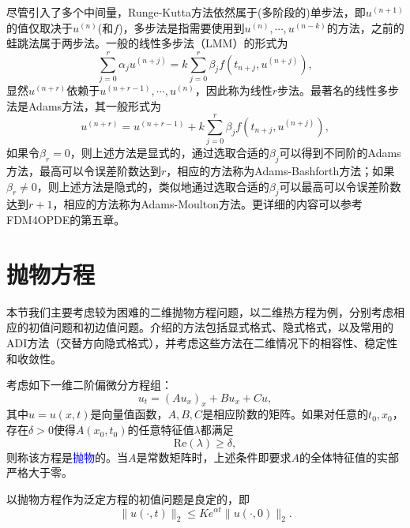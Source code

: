 \documentclass[a4paper,10pt]{ctexart}
\begin{document}
尽管引入了多个中间量，Runge-Kutta方法依然属于(多阶段的)单步法，即$ u^{(n+1)} $的值仅取决于$ u^{(n)} $(和$ f $)，多步法是指需要使用到$ u^{(n)},\cdots ,u^{(n-k)} $的方法，之前的蛙跳法属于两步法。一般的线性多步法（LMM）的形式为
\begin{equation}
    \sum_{j=0}^{r} \alpha_j u^{(n+j)} = k\sum_{j=0}^{r} \beta_j f(t_{n+j},u^{(n+j)}),
\end{equation}
显然$ u^{(n+r)} $依赖于$ u^{(n+r-1)},\cdots ,u^{(n)} $，因此称为线性$ r $步法。最著名的线性多步法是Adams方法，其一般形式为
\begin{equation}
    u^{(n+r)} = u^{(n+r-1)} + k\sum_{j=0}^{r} \beta_j f(t_{n+j},u^{(n+j)}),
\end{equation}
如果令$ \beta_r=0 $，则上述方法是显式的，通过选取合适的$ \beta_j $可以得到不同阶的Adams方法，最高可以令误差阶数达到$ r $，相应的方法称为Adams-Bashforth方法；如果$ \beta_r\ne 0 $，则上述方法是隐式的，类似地通过选取合适的$ \beta_j $可以最高可以令误差阶数达到$ r+1 $，相应的方法称为Adams-Moulton方法。更详细的内容可以参考FDM4OPDE的第五章。

\section{抛物方程}
本节我们主要考虑较为困难的二维抛物方程问题，以二维热方程为例，分别考虑相应的初值问题和初边值问题。介绍的方法包括显式格式、隐式格式，以及常用的ADI方法（交替方向隐式格式），并考虑这些方法在二维情况下的相容性、稳定性和收敛性。

\begin{definition}
    考虑如下一维二阶偏微分方程组：
    \begin{equation}
        u_t = (Au_x)_x+Bu_x + Cu,
    \end{equation}
    其中$ u=u(x,t) $是向量值函数，$ A,B,C $是相应阶数的矩阵。如果对任意的$ t_0,x_0 $，存在$ \delta>0 $使得$ A(x_0,t_0) $的任意特征值$ \lambda $都满足
    \begin{equation}
        \text{Re}(\lambda)\geqslant \delta,
    \end{equation}
    则称该方程是\textcolor{blue}{抛物}的。当$ A $是常数矩阵时，上述条件即要求$ A $的全体特征值的实部严格大于零。
\end{definition}
\noindent 以抛物方程作为泛定方程的初值问题是良定的，即
\[
    \| u(\cdot,t) \|_2 \leqslant K e^{\alpha t} \| u(\cdot, 0) \|_2.
\]
\end{document}
